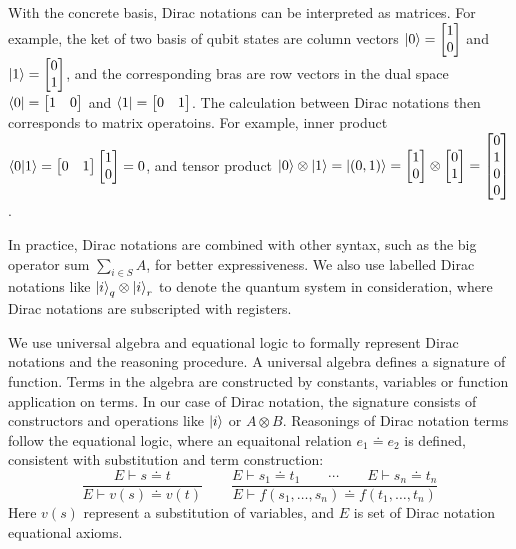 \documentclass[runningheads]{llncs}
\begin{document}
With the concrete basis, Dirac notations can be interpreted as matrices. For example, the ket of two basis of qubit states are column vectors $\ket{0} = \begin{bmatrix} 1 \\ 0 \end{bmatrix}$ and $\ket{1} = \begin{bmatrix} 0 \\ 1 \end{bmatrix}$, and the corresponding bras are row vectors in the dual space $\bra{0} = \begin{bmatrix} 1 & 0 \end{bmatrix}$ and $\bra{1} = \begin{bmatrix} 0 & 1 \end{bmatrix}$.
The calculation between Dirac notations then corresponds to matrix operatoins. For example, inner product $\braket{0| 1} = \begin{bmatrix} 0 & 1 \end{bmatrix} \begin{bmatrix} 1 \\ 0 \end{bmatrix} = 0$, and tensor product $\ket{0} \otimes \ket{1} = \ket{(0, 1)} = \begin{bmatrix} 1 \\ 0 \end{bmatrix} \otimes \begin{bmatrix} 0 \\ 1 \end{bmatrix} = \begin{bmatrix} 0 \\ 1 \\ 0 \\ 0 \end{bmatrix}$.

In practice, Dirac notations are combined with other syntax, such as the big operator sum $\sum_{i \in S} A$, for better expressiveness. We also use labelled Dirac notations like $\ket{i}_q \otimes \ket{i}_r$ to denote the quantum system in consideration, where Dirac notations are subscripted with registers.

We use universal algebra and equational logic to formally represent Dirac notations and the reasoning procedure.
A universal algebra defines a signature of function. Terms in the algebra are constructed by constants, variables or function application on terms. In our case of Dirac notation, the signature consists of constructors and operations like $\ket{i}$ or $A \otimes B$.
Reasonings of Dirac notation terms follow the equational logic, where an equaitonal relation $e_1 \doteq e_2$ is defined, consistent with substitution and term construction:
\[
    \frac{E \vdash s \doteq t}{E \vdash v(s) \doteq v(t)}
    \qquad
    \frac{E \vdash s_1 \doteq t_1 \qquad \cdots \qquad E \vdash s_n \doteq t_n}{E \vdash f(s_1, \dots, s_n) \doteq f(t_1, \dots, t_n)}
\]
Here $v(s)$ represent a substitution of variables, and $E$ is set of Dirac notation equational axioms.
\end{document}
